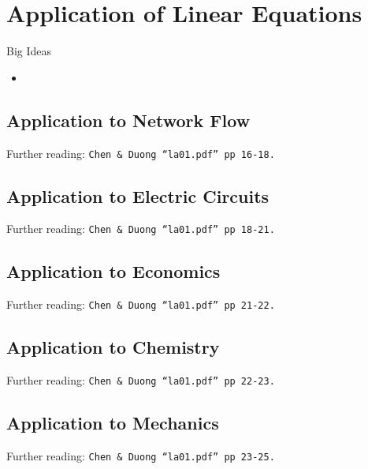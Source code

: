 \chapter{Application of Linear Equations}
\label{chap:ALE}

\begin{bigideas}{Big Ideas}
\label{sec:ALE Big Ideas}
\begin{itemize}
  \item 
\end{itemize}
\end{bigideas}

\section{Application to Network Flow}
\label{sec:ALE Network Flow}
Further reading: \texttt{Chen \& Duong ``la01.pdf'' pp 16-18.}

\section{Application to Electric Circuits}
\label{sec:ALE Electric Circuits}
Further reading: \texttt{Chen \& Duong ``la01.pdf'' pp 18-21.}

\section{Application to Economics}
\label{sec:ALE Economics}
Further reading: \texttt{Chen \& Duong ``la01.pdf'' pp 21-22.}

\section{Application to Chemistry}
\label{sec:ALE Chemistry}
Further reading: \texttt{Chen \& Duong ``la01.pdf'' pp 22-23.}

\section{Application to Mechanics}
\label{sec:ALE Mechanics}
Further reading: \texttt{Chen \& Duong ``la01.pdf'' pp 23-25.}